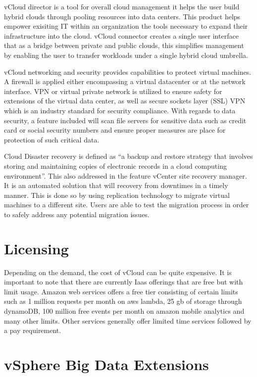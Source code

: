 \documentclass[9pt,twocolumn,twoside]{styles/osajnl}
\begin{document}
vCloud director is a tool for overall cloud management it
helps the user build hybrid clouds through pooling resources into data
centers.  This product helps empower exisiting IT within an
organization the tools necessary to expand their infrastructure into
the cloud. vCloud connector creates a single user interface that as a
bridge between private and public clouds, this simplifies management
by enabling the user to transfer workloads under a single hybrid cloud
umbrella.

vCloud networking and security provides capabilities to
protect virtual machines.  A firewall is applied either encompassing a
virtual datacenter or at the network interface.  VPN or virtual
private network is utilized to ensure safety for extensions of the
virtual data center, as well as secure sockets layer (SSL) VPN which
is an industry standard for security compliance. \cite{www-vmware3}
With regards to data security, a feature included will scan file
servers for sensitive data such as credit card or social security
numbers and ensure proper measures are place for protection of such
critical data.

Cloud Disaster recovery is defined as “a backup and
restore strategy that involves storing and maintaining copies of
electronic records in a cloud computing environment”. \cite{www-cloud}
This also addressed in the feature vCenter site recovery manager.  It
is an automated solution that will recovery from downtimes in a timely
manner.  This is done so by using replication technology to migrate
virtual machines to a different site.  Users are able to test the
migration process in order to safely address any potential migration
issues.

\section{Licensing}

Depending on the demand, the cost of vCloud can be quite expensive.
It is important to note that there are currently Iaas offerings that
are free but with limit usage.  Amazon web services offers a free tier
consisting of certain limits such as 1 million requests per month on
aws lambda, 25 gb of storage through dynamoDB, 100 million free events
per month on amazon mobile analytics and many other
limits. \cite{www-aws} Other services generally offer limited time
services followed by a pay requirement.

\section{vSphere Big Data Extensions}
\end{document}
